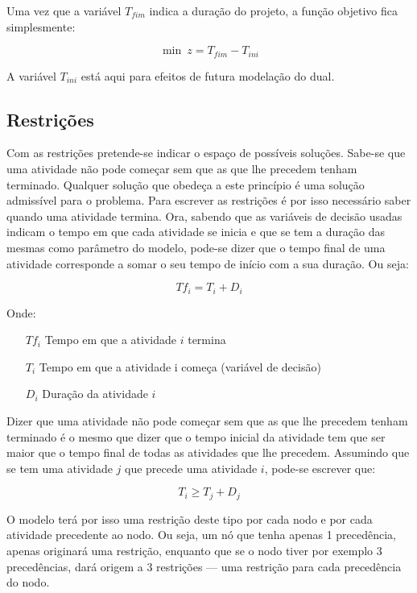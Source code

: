 Uma vez que a variável $T_{fim}$ indica a duração do projeto, a função
objetivo fica simplesmente:

\begin{displaymath} 
	\min~z = T_{fim}-T_{ini} 
\end{displaymath}

A variável $T_{ini}$ está aqui para efeitos de futura modelação do dual.

\subsection{Restrições}

Com as restrições pretende-se indicar o espaço de possíveis soluções. Sabe-se
que uma atividade não pode começar sem que as que lhe precedem tenham terminado.
Qualquer solução que obedeça a este princípio é uma solução admissível para
o problema. Para escrever as restrições é por isso necessário saber quando uma
atividade termina. Ora, sabendo que as variáveis de decisão usadas indicam
o tempo em que cada atividade se inicia e que se tem a duração das mesmas como
parâmetro do modelo, pode-se dizer que o tempo final de uma atividade
corresponde a somar o seu tempo de início com a sua duração. Ou seja:

\begin{displaymath} Tf_{i} = T_{i} + D_{i} \end{displaymath}

Onde:

\begin{itemize} \item[$Tf_{i}$] Tempo em que a atividade $i$ termina
		\item[$T_{i}$] Tempo em que a atividade i começa (variável de decisão)
		\item[$D_{i}$] Duração da atividade $i$ \end{itemize}

Dizer que uma atividade não pode começar sem que as que lhe precedem tenham
terminado é o mesmo que dizer que o tempo inicial da atividade tem que ser maior
que o tempo final de todas as atividades que lhe precedem. Assumindo que se tem
uma atividade $j$ que precede uma atividade $i$, pode-se escrever que:

\begin{displaymath} T_{i} \geq T_{j} + D_{j} \end{displaymath}

O modelo terá por isso uma restrição deste tipo por cada nodo e por cada
atividade precedente ao nodo. Ou seja, um nó que tenha apenas 1 precedência,
apenas originará uma restrição, enquanto que se o nodo tiver por exemplo
3 precedências, dará origem a 3 restrições --- uma restrição para cada precedência
do nodo. 

